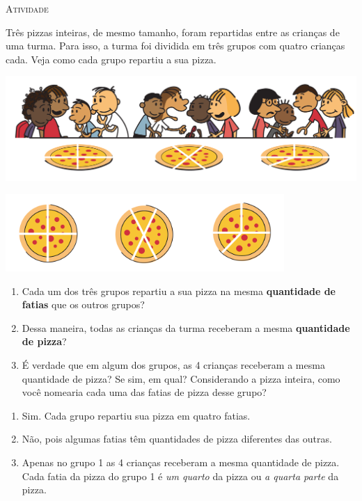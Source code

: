 \documentclass[10 pt,usenames,dvipsnames, oneside]{article}
\begin{document}
\bigskip
\begin{center}
{\large \scshape Atividade}
\end{center}
\fi

Três pizzas inteiras, de mesmo tamanho, foram repartidas entre as crianças de uma turma. Para isso, a turma foi dividida em três grupos com quatro crianças cada. Veja como cada grupo repartiu a sua pizza.

\begin{center}
    \includegraphics[width=400pt, keepaspectratio]{ativ2_fig01.png}

    \includegraphics[width=300pt, keepaspectratio]{ativ2_fig02.png}
\end{center}

\begin{enumerate}[label=\alph*)] %
  \item Cada um dos três grupos repartiu a sua pizza na mesma \textbf{quantidade de fatias} que os outros grupos?
  \item Dessa maneira, todas as crianças da turma receberam a mesma \textbf{quantidade de pizza}?
  \item É verdade que em algum dos grupos, as 4 crianças receberam a mesma quantidade de pizza? Se sim, em qual? Considerando a pizza inteira, como você nomearia cada uma das fatias de pizza desse grupo?
\end{enumerate} %

\ifdefined\prof

\begin{solucao}

\begin{enumerate}[label=\alph*),wide,labelindent=0pt] %
    \item       Sim. Cada grupo repartiu sua pizza em quatro fatias.
    \item       Não, pois algumas fatias têm quantidades de pizza diferentes das outras.
    \item       Apenas no grupo 1 as 4 crianças receberam a mesma quantidade de pizza. Cada fatia da pizza do grupo 1 é {\it um quarto} da pizza ou {\it a quarta parte} da pizza.
\end{enumerate} %

\end{solucao}
\fi
\end{document}
